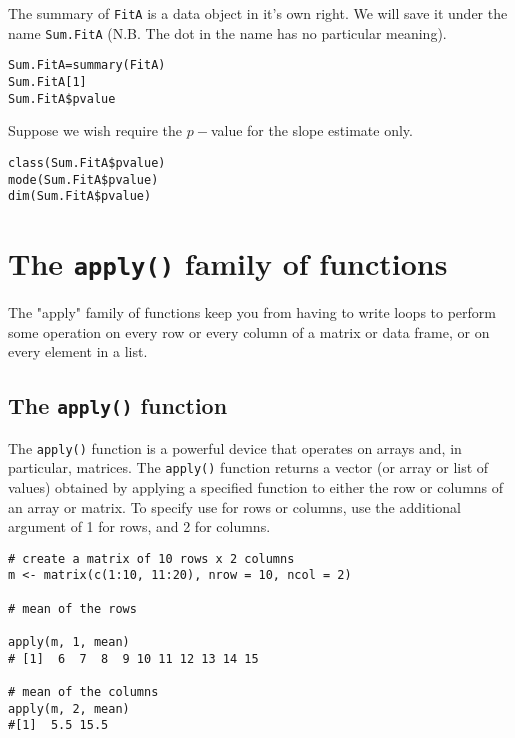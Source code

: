 \documentclass[a4paper,12pt]{article}
\begin{document}
The summary of \texttt{FitA} is a data object in it's own right. We will save it under the name \texttt{Sum.FitA} (N.B. The dot in the name has no particular meaning).
\begin{framed}
\begin{verbatim}
Sum.FitA=summary(FitA)
Sum.FitA[1]
Sum.FitA$pvalue
\end{verbatim}
\end{framed}
Suppose we wish require the $p-$value for the slope estimate only.
\begin{framed}
\begin{verbatim}
class(Sum.FitA$pvalue)
mode(Sum.FitA$pvalue)
dim(Sum.FitA$pvalue)
\end{verbatim}
\end{framed}
\section{The \texttt{apply()} family of functions}

The "apply" family of functions keep you from having to write loops to perform 
some operation on every row or every column of a matrix or data frame, or on 
every element in a list.

\subsection{The \texttt{apply()} function}
The \texttt{apply()} function is a powerful device that operates on arrays and,
 in particular, matrices.
The \texttt{apply()} function returns a vector (or array or list of values) 
obtained by applying a specified function to either the row or columns of 
an array or matrix.
To specify use for rows or columns, use the additional argument of 1 for rows, 
and 2 for columns.
\begin{framed}
\begin{verbatim}
# create a matrix of 10 rows x 2 columns
m <- matrix(c(1:10, 11:20), nrow = 10, ncol = 2)

# mean of the rows

apply(m, 1, mean)
# [1]  6  7  8  9 10 11 12 13 14 15

# mean of the columns
apply(m, 2, mean)
#[1]  5.5 15.5
\end{verbatim}
\end{framed}
\end{document}
